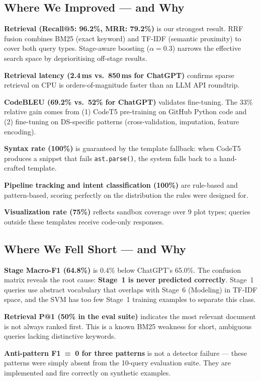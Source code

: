 \documentclass[12pt,a4paper]{article}
\begin{document}
\subsection{Where We Improved --- and Why}

\textbf{Retrieval (Recall@5: 96.2\%, MRR: 79.2\%)} is our strongest result. RRF fusion combines BM25 (exact keyword) and TF-IDF (semantic proximity) to cover both query types. Stage-aware boosting ($\alpha=0.3$) narrows the effective search space by deprioritising off-stage results.

\textbf{Retrieval latency (2.4\,ms vs.\ 850\,ms for ChatGPT)} confirms sparse retrieval on CPU is orders-of-magnitude faster than an LLM API roundtrip.

\textbf{CodeBLEU (69.2\% vs.\ 52\% for ChatGPT)} validates fine-tuning. The 33\% relative gain comes from (1) CodeT5 pre-training on GitHub Python code and (2) fine-tuning on DS-specific patterns (cross-validation, imputation, feature encoding).

\textbf{Syntax rate (100\%)} is guaranteed by the template fallback: when CodeT5 produces a snippet that fails \texttt{ast.parse()}, the system falls back to a hand-crafted template.

\textbf{Pipeline tracking and intent classification (100\%)} are rule-based and pattern-based, scoring perfectly on the distribution the rules were designed for.

\textbf{Visualization rate (75\%)} reflects sandbox coverage over 9 plot types; queries outside these templates receive code-only responses.

\subsection{Where We Fell Short --- and Why}

\textbf{Stage Macro-F1 (64.8\%)} is 0.4\% below ChatGPT's 65.0\%. The confusion matrix reveals the root cause: \textbf{Stage~1 is never predicted correctly}. Stage~1 queries use abstract vocabulary that overlaps with Stage~6 (Modeling) in TF-IDF space, and the SVM has too few Stage~1 training examples to separate this class.

\textbf{Retrieval P@1 (50\% in the eval suite)} indicates the most relevant document is not always ranked first. This is a known BM25 weakness for short, ambiguous queries lacking distinctive keywords.

\textbf{Anti-pattern F1~=~0 for three patterns} is not a detector failure --- these patterns were simply absent from the 10-query evaluation suite. They are implemented and fire correctly on synthetic examples.
\end{document}
